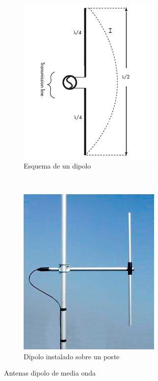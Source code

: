 \begin{figure}[h]
\centering
	\begin{subfigure}[b]{0.4\textwidth} %
		\centering
		\includegraphics[width=7cm]{archivos/dipolo/dipole1} %
		\caption{Esquema de un dipolo}
		\label{fig:dipolo1}
	\end{subfigure}
~ %
	\begin{subfigure}[b]{0.4\textwidth} %
	\centering
		\includegraphics[width=7cm]{archivos/dipolo/dipole2} %
		\caption{Dipolo instalado sobre un poste}
		\label{fig:dipolo2}
	\end{subfigure}
\caption{Antenas dipolo de media onda}\label{fig:dipolo}
\end{figure}

